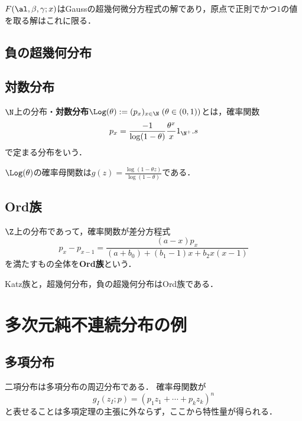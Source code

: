 \documentclass[uplatex,dvipdfmx]{jsreport}
\begin{document}
\begin{proposition}[Riemann]
    $F(\al,\beta,\gamma;x)$はGaussの超幾何微分方程式の解であり，原点で正則でかつ$1$の値を取る解はこれに限る．
\end{proposition}

\subsection{負の超幾何分布}

\subsection{対数分布}

\begin{definition}
    $\N$上の分布・\textbf{対数分布}$\Log(\theta):=(p_x)_{x\in\N}\;(\theta\in(0,1))$とは，確率関数
    \[p_x=\frac{-1}{\log(1-\theta)}\frac{\theta^x}{x}1_{\N^+}.s\]
    で定まる分布をいう．
\end{definition}

\begin{proposition}
    $\Log(\theta)$の確率母関数は$g(z)=\frac{\log(1-\theta z)}{\log(1-\theta)}$である．
\end{proposition}

\subsection{Ord族}

\begin{definition}
    $\Z$上の分布であって，確率関数が差分方程式
    \[p_x-p_{x-1}=\frac{(a-x)p_x}{(a+b_0)+(b_1-1)x+b_2x(x-1)}\]
    を満たすもの全体を\textbf{Ord族}という．
\end{definition}
\begin{example}
    Katz族と，超幾何分布，負の超幾何分布はOrd族である．
\end{example}

\section{多次元純不連続分布の例}

\subsection{多項分布}

\begin{tcolorbox}[colframe=ForestGreen, colback=ForestGreen!10!white,breakable,colbacktitle=ForestGreen!40!white,coltitle=black,fonttitle=\bfseries\sffamily,
title=]
    二項分布は多項分布の周辺分布である．
    確率母関数が
    \[g_I(z_I;p)=(p_1z_1+\cdots+p_kz_k)^n\]
    と表せることは多項定理の主張に外ならず，ここから特性量が得られる．
\end{tcolorbox}
\end{document}
